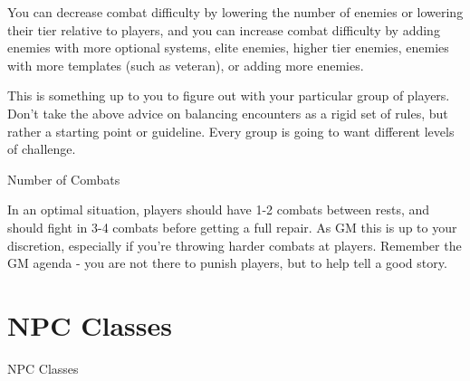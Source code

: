 You can decrease combat difficulty by lowering the number of enemies or lowering their tier  
relative to players, and you can increase combat difficulty by adding enemies with more optional  
systems, elite enemies, higher tier enemies, enemies with more templates (such as veteran), or  
adding more enemies.
 

                                                                                                          


This is something up to you to figure out with your particular group of players. Don’t take the  
above advice on balancing encounters as a rigid set of rules, but rather a starting point or  
guideline. Every group is going to want different levels of challenge.
 

                                          Number of Combats  

In an optimal situation, players should have 1-2 combats between rests, and should fight in 3-4  
combats before getting a full repair. As GM this is up to your discretion, especially if you’re  
throwing harder combats at players. Remember the GM agenda - you are not there to punish  
players, but to help tell a good story.
 
\chapter{NPC Classes}

        NPC Classes 





























